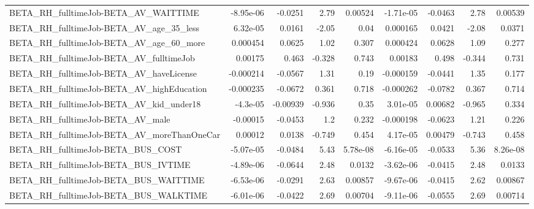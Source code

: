 \begin{tabular}{lrrrrrrrr}
BETA\_RH\_fulltimeJob-BETA\_AV\_WAITTIME               &   -8.95e-06 &      -0.0251 &     2.79 &  0.00524 &  -1.71e-05 &     -0.0463 &         2.78 &       0.00539 \\
BETA\_RH\_fulltimeJob-BETA\_AV\_age\_35\_less            &    6.32e-05 &       0.0161 &    -2.05 &     0.04 &   0.000165 &      0.0421 &        -2.08 &        0.0371 \\
BETA\_RH\_fulltimeJob-BETA\_AV\_age\_60\_more            &    0.000454 &       0.0625 &     1.02 &    0.307 &   0.000424 &      0.0628 &         1.09 &         0.277 \\
BETA\_RH\_fulltimeJob-BETA\_AV\_fulltimeJob            &     0.00175 &        0.463 &   -0.328 &    0.743 &    0.00183 &       0.498 &       -0.344 &         0.731 \\
BETA\_RH\_fulltimeJob-BETA\_AV\_haveLicense            &   -0.000214 &      -0.0567 &     1.31 &     0.19 &  -0.000159 &     -0.0441 &         1.35 &         0.177 \\
BETA\_RH\_fulltimeJob-BETA\_AV\_highEducation          &   -0.000235 &      -0.0672 &    0.361 &    0.718 &  -0.000262 &     -0.0782 &        0.367 &         0.714 \\
BETA\_RH\_fulltimeJob-BETA\_AV\_kid\_under18            &    -4.3e-05 &     -0.00939 &   -0.936 &     0.35 &   3.01e-05 &     0.00682 &       -0.965 &         0.334 \\
BETA\_RH\_fulltimeJob-BETA\_AV\_male                   &    -0.00015 &      -0.0453 &      1.2 &    0.232 &  -0.000198 &     -0.0623 &         1.21 &         0.226 \\
BETA\_RH\_fulltimeJob-BETA\_AV\_moreThanOneCar         &     0.00012 &       0.0138 &   -0.749 &    0.454 &   4.17e-05 &     0.00479 &       -0.743 &         0.458 \\
BETA\_RH\_fulltimeJob-BETA\_BUS\_COST                  &   -5.07e-05 &      -0.0484 &     5.43 & 5.78e-08 &  -6.16e-05 &     -0.0533 &         5.36 &      8.26e-08 \\
BETA\_RH\_fulltimeJob-BETA\_BUS\_IVTIME                &   -4.89e-06 &      -0.0644 &     2.48 &   0.0132 &  -3.62e-06 &     -0.0415 &         2.48 &        0.0133 \\
BETA\_RH\_fulltimeJob-BETA\_BUS\_WAITTIME              &   -6.53e-06 &      -0.0291 &     2.63 &  0.00857 &  -9.67e-06 &     -0.0415 &         2.62 &       0.00867 \\
BETA\_RH\_fulltimeJob-BETA\_BUS\_WALKTIME              &   -6.01e-06 &      -0.0422 &     2.69 &  0.00704 &  -9.11e-06 &     -0.0555 &         2.69 &       0.00714 \\

\end{tabular}
